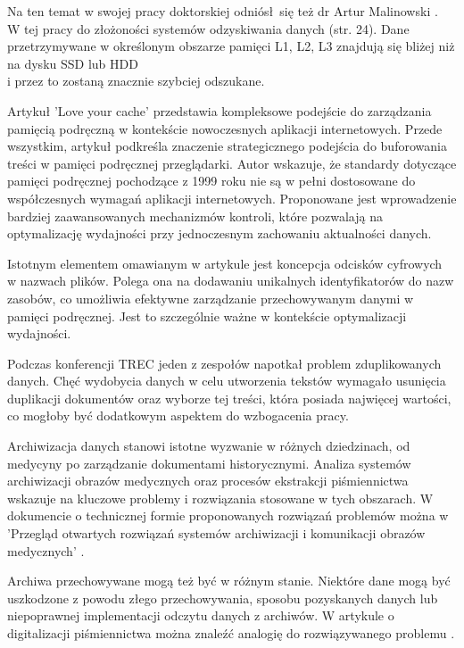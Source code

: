 Na ten temat w swojej pracy doktorskiej odniósł się też dr Artur Malinowski \cite{bib:internet:ArturMalinowskiIO}. \\
W tej pracy do złożoności systemów odzyskiwania danych (str. 24). Dane 
przetrzymywane w określonym obszarze pamięci L1, L2, L3 znajdują się
bliżej niż na dysku SSD lub HDD \\ i przez to zostaną znacznie szybciej odszukane. 

Artykuł 'Love your cache' \cite{bib:internet:TwojaPamiećPodręczna} przedstawia
kompleksowe podejście do zarządzania 
pamięcią podręczną w kontekście nowoczesnych aplikacji internetowych. Przede 
wszystkim, artykuł podkreśla znaczenie strategicznego podejścia do buforowania 
treści w pamięci podręcznej przeglądarki. Autor wskazuje, że standardy 
dotyczące pamięci podręcznej pochodzące z 1999 roku nie są w pełni dostosowane 
do współczesnych wymagań aplikacji internetowych. Proponowane jest wprowadzenie
bardziej zaawansowanych mechanizmów kontroli, które pozwalają na optymalizację
wydajności przy jednoczesnym zachowaniu aktualności danych.

Istotnym elementem omawianym w artykule jest koncepcja odcisków cyfrowych \\ w
nazwach plików. Polega ona na dodawaniu unikalnych identyfikatorów do nazw 
zasobów, co umożliwia efektywne zarządzanie przechowywanym danymi w pamięci 
podręcznej. Jest to szczególnie ważne w kontekście optymalizacji wydajności.

Podczas konferencji TREC \cite{bib:konferencja:TRECDuplicates} jeden z zespołów 
napotkał problem zduplikowanych danych. Chęć wydobycia danych w celu utworzenia
tekstów wymagało usunięcia duplikacji dokumentów oraz wyborze tej treści,
która posiada najwięcej wartości, co mogłoby być dodatkowym aspektem do wzbogacenia pracy. 

Archiwizacja danych stanowi istotne wyzwanie w różnych dziedzinach, od medycyny 
po zarządzanie dokumentami historycznymi. Analiza systemów archiwizacji obrazów
medycznych oraz procesów ekstrakcji piśmiennictwa wskazuje na kluczowe problemy
i rozwiązania stosowane w tych obszarach. W dokumencie o technicznej formie
proponowanych rozwiązań problemów można w 'Przegląd otwartych rozwiązań systemów 
archiwizacji i komunikacji obrazów medycznych' \cite{bib:internet:ArchiwizacjaDanychMedycznych}.

Archiwa przechowywane mogą też być w różnym stanie. Niektóre dane mogą być
uszkodzone z powodu złego przechowywania, sposobu pozyskanych danych lub 
niepoprawnej implementacji odczytu danych z archiwów. W artykule o
digitalizacji piśmiennictwa można znaleźć analogię do rozwiązywanego problemu \cite{bib:internet:GovDigitalizacjaPiśmiennictwa}.

